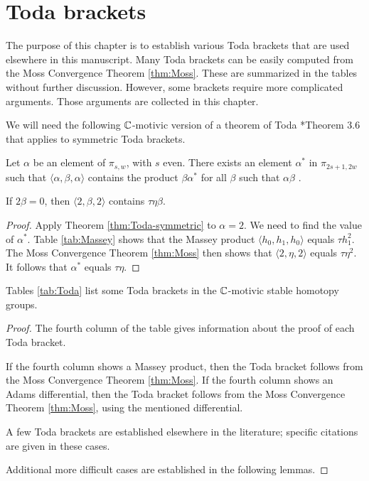 \chapter{Toda brackets}
\label{ch:Toda}

The purpose of this chapter is to establish various Toda brackets
that are used elsewhere in this manuscript.
Many Toda brackets can be easily computed from
the Moss Convergence Theorem \ref{thm:Moss}.
These are summarized in the tables without further
discussion.  
However, some brackets require more complicated arguments.
Those arguments are collected in this chapter.

We will need the
following 
$\mathbb{C}$-motivic version of a 
theorem of Toda \cite{Toda62}*{Theorem 3.6} that applies to
symmetric Toda brackets.

\begin{thm}
\label{thm:Toda-symmetric}
Let $\alpha$ be an element of $\pi_{s,w}$, with $s$ even.
There exists an element $\alpha^*$ in $\pi_{2s+1,2w}$ such that
$\langle \alpha, \beta, \alpha \rangle$ contains
the product $\beta \alpha^*$ for all $\beta$ such that
$\alpha \beta$ .
\end{thm}

\begin{cor}
\label{cor:2-symmetric}
If $2 \beta = 0$, then $\langle 2, \beta, 2 \rangle$
contains $\tau \eta \beta$.
\end{cor}

\begin{proof}
Apply Theorem \ref{thm:Toda-symmetric} to $\alpha = 2$.
We need to find the value of $\alpha^*$. 
Table \ref{tab:Massey} shows that
the Massey product $\langle h_0, h_1, h_0 \rangle$
equals $\tau h_1^2$.
The Moss Convergence Theorem \ref{thm:Moss} then shows that 
$\langle 2, \eta, 2 \rangle$ equals $\tau \eta^2$.
It follows that $\alpha^*$ equals $\tau \eta$.
\end{proof}


\begin{thm}
\label{thm:Toda}
Tables \ref{tab:Toda}  list 
some Toda brackets in the 
$\mathbb{C}$-motivic stable homotopy groups.
\end{thm}

\begin{proof}
The fourth column of the table gives information about the proof
of each Toda bracket.  

If the fourth column shows a Massey product, then the 
Toda bracket follows from the Moss Convergence Theorem \ref{thm:Moss}.
If the fourth column shows an Adams differential, then
the Toda bracket follows from the Moss Convergence Theorem \ref{thm:Moss},
using the mentioned differential.

A few Toda brackets are established elsewhere in the literature; 
specific citations are given in these cases.

Additional more difficult cases are established in the following lemmas.
\end{proof}

